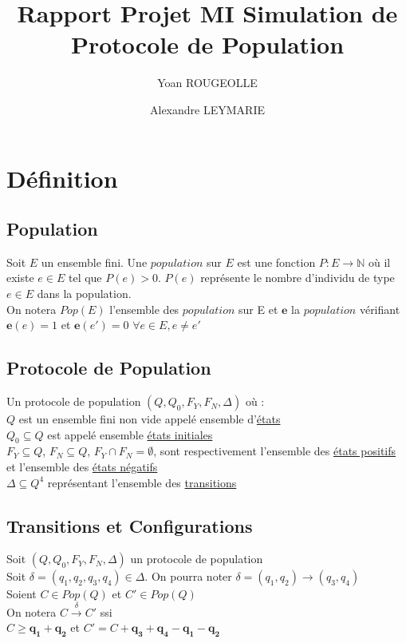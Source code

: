 \documentclass[a4paper,12pt]{report}
\title{Rapport Projet MI Simulation de Protocole de Population}
\author{Yoan ROUGEOLLE \and Alexandre LEYMARIE }
\date{}
\begin{document}
\maketitle

\section{Définition}

\subsection{Population}

Soit $E$ un ensemble fini. Une $population$ sur $E$ est une fonction $P: E \longrightarrow \mathbb{N}$ où il existe $e \in E$ tel que $P(e) > 0$. $P(e)$ représente le nombre d'individu de type $e \in E$ dans la population.\\
On notera $Pop(E)$ l'ensemble des $population$ sur E et $\boldsymbol{e}$  la $population$ vérifiant $\boldsymbol{e}(e) = 1$ et $\boldsymbol{e}(e') = 0$ $\forall e \in E, e \ne e'$

\subsection{Protocole de Population}
Un protocole de population $(Q, Q_{0}, F_{Y}, F_{N},\Delta)$ où :\\
$Q$ est un ensemble fini non vide appelé ensemble d'\underline{états}\\
$Q_{0} \subseteq Q$ est appelé ensemble \underline{états initiales}\\
$F_{Y} \subseteq Q$, $F_{N} \subseteq Q$,  $F_{Y} \cap F_{N} = \emptyset$, sont respectivement l'ensemble des \underline{états positifs} et l'ensemble des \underline{états négatifs}\\
$\Delta \subseteq Q^{4}$ représentant l'ensemble des \underline{transitions}

\subsection{Transitions et Configurations}
Soit $(Q, Q_{0}, F_{Y}, F_{N},\Delta)$ un protocole de population\\
Soit $\delta=(q_{1},q_{2},q_{3},q_{4}) \in \Delta$. On pourra noter $\delta = (q_{1}, q_{2}) \rightarrow (q_{3},q_{4})$\\
Soient $C \in Pop(Q)$ et $C' \in Pop(Q)$\\
On notera $C \xrightarrow{\delta} C'$ ssi\\
$C \geq \boldsymbol{q_{1}} + \boldsymbol{q_{2}}$ et $C' = C + \boldsymbol{q_{3}} + \boldsymbol{q_{4}} - \boldsymbol{q_{1}} - \boldsymbol{q_{2}}$
\end{document}
